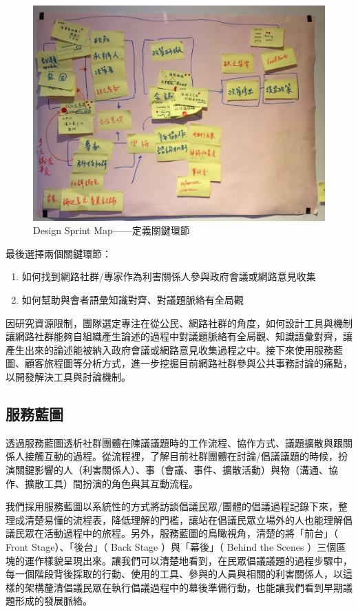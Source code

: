\documentclass[12pt,a4paper]{article}
\begin{document}
\begin{figure}[htbp]
\centering
\includegraphics[width=.9\linewidth]{./images/design_sprint_map.jpg}
\caption{\label{fig:orgdf5af62}
Design Sprint Map——定義關鍵環節}
\end{figure}

最後選擇兩個關鍵環節：
\begin{enumerate}
\item 如何找到網路社群/專家作為利害關係人參與政府會議或網路意見收集
\item 如何幫助與會者語彙知識對齊、對議題脈絡有全局觀
\end{enumerate}

因研究資源限制，團隊選定專注在從公民、網路社群的角度，如何設計工具與機制讓網路社群能夠自組織產生論述的過程中對議題脈絡有全局觀、知識語彙對齊，讓產生出來的論述能被納入政府會議或網路意見收集過程之中。接下來使用服務藍圖、顧客旅程圖等分析方式，進一步挖掘目前網路社群參與公共事務討論的痛點，以開發解決工具與討論機制。
\subsection{服務藍圖}
\label{sec:org1cfda34}
透過服務藍圖透析社群團體在陳議議題時的工作流程、協作方式、議題擴散與跟關係人接觸互動的過程。從流程裡，了解目前社群團體在討論/倡議議題的時候，扮演關鍵影響的人（利害關係人）、事（會議、事件、擴散活動）與物（溝通、協作、擴散工具）間扮演的角色與其互動流程。

我們採用服務藍圖以系統性的方式將訪談倡議民眾/團體的倡議過程記錄下來，整理成清楚易懂的流程表，降低理解的門檻，讓站在倡議民眾立場外的人也能理解倡議民眾在活動過程中的旅程。另外，服務藍圖的鳥瞰視角，清楚的將「前台」（ Front Stage）、「後台」（ Back Stage ）與「幕後」（ Behind the Scenes ）三個區塊的運作樣貌呈現出來。讓我們可以清楚地看到，在民眾倡議議題的過程步驟中，每一個階段背後採取的行動、使用的工具、參與的人員與相關的利害關係人，以這樣的架構釐清倡議民眾在執行倡議過程中的幕後準備行動，也能讓我們看到早期議題形成的發展脈絡。
\end{document}

